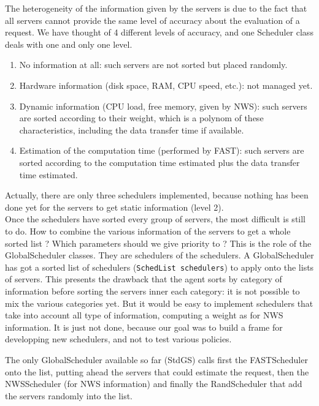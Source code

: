 The heterogeneity of the information given by the servers is due to the fact
that all servers cannot provide the same level of accuracy about the evaluation
of a request. We have thought of 4 different levels of accuracy, and one
\textsf{Scheduler} class deals with one and only one level.
\begin{enumerate}
\item No information at all: such servers are not sorted but placed randomly.
\item Hardware information (disk space, RAM, CPU speed, etc.): not managed yet.
\item Dynamic information (CPU load, free memory, given by NWS): such servers
  are sorted according to their weight, which is a polynom of these
  characteristics, including the data transfer time if available.
\item Estimation of the computation time (performed by FAST): such servers
  are sorted according to the computation time estimated plus the data transfer
  time estimated.
\end{enumerate}

Actually, there are only three schedulers implemented, because nothing has been
done yet for the servers to get static information (level 2).
\\

Once the schedulers have sorted every group of servers, the most difficult is
still to do. How to combine the various information of the servers to get a
whole sorted list ? Which parameters should we give priority to ? This is the
role of the \textsf{GlobalScheduler} classes. They are schedulers of the
schedulers. A \textsf{GlobalScheduler} has got a sorted list of schedulers
(\texttt{SchedList schedulers}) to apply onto the lists of servers. This
presents the drawback that the agent sorts by category of information before
sorting the servers inner each category: it is not possible to mix the various
categories yet. But it would be easy to implement schedulers that take into
account all type of information, computing a weight as for NWS information. It
is just not done, because our goal was to build a frame for developping new
schedulers, and not to test various policies.

The only \textsf{GlobalScheduler} available so far (\textsf{StdGS}) calls first
the \textsf{FASTScheduler} onto the list, putting ahead the servers that could
estimate the request, then the \textsf{NWSScheduler} (for NWS information) and
finally the \textsf{RandScheduler} that add the servers randomly into the list.
\\

